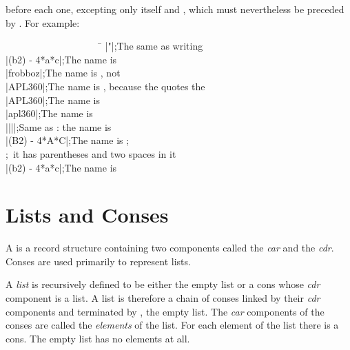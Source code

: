 before each one, excepting only
\cd{|} itself and \cd{{\Xbackslash}}, which must nevertheless be preceded by \cd{{\Xbackslash}}.
For example:
\begin{lisp}
~~~~~~~~~~~~~~~~~~~~\=\kill
|"|\>;{\rm The same as writing } \\
|(b{\Xcircumflex}2) - 4*a*c|\>;{\rm The name is } \\
|frobboz|\>;{\rm The name is , not } \\
|APL{\Xbackslash}360|\>;{\rm The name is , because the \cd{{\Xbackslash}} quotes the } \\
|APL{\Xbackslash}{\Xbackslash}360|\>;{\rm The name is } \\
|apl{\Xbackslash}{\Xbackslash}360|\>;{\rm The name is } \\
|{\Xbackslash}|{\Xbackslash}||\>;{\rm Same as \cd{{\Xbackslash}|{\Xbackslash}|}: the name is \cd{||}} \\
|(B{\Xcircumflex}2) - 4*A*C|\>;{\rm The name is ;} \\
\>;~{\rm it has parentheses and two spaces in it} \\
|(b{\Xcircumflex}2) - 4*a*c|\>;{\rm The name is }
\end{lisp}


\section{Lists and Conses}

A  is a record structure containing two components
called the {\it car} and the {\it cdr}.  Conses are used primarily
to represent lists.

A {\it list} is recursively defined to be either the empty list
or a cons whose {\it cdr} component is a list.
A list is therefore a chain of conses linked by their {\it cdr} components
and terminated by {\nil}, the empty list.  The {\it car} components of the conses
are called the {\it elements} of the list.  For each element of the list
there is a cons.  The empty list has no elements at all.

